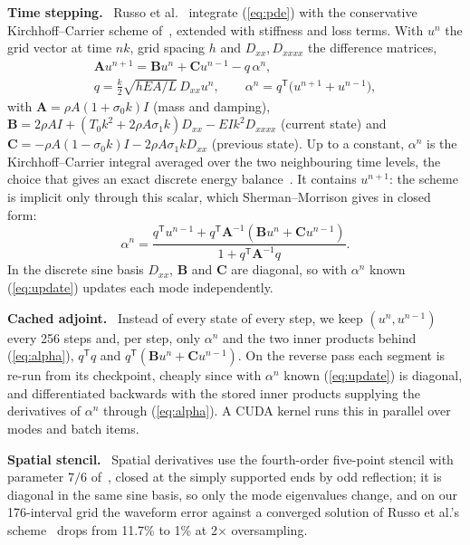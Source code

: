 \documentclass[a4paper]{article}
\newcommand{\head}[1]{\par\vspace{2pt}\noindent\textbf{#1.}\ \ignorespaces}
\begin{document}
\begin{sloppy}
\head{Time stepping}
Russo et al.~\cite{russo2026} integrate (\ref{eq:pde}) with the conservative
Kirchhoff--Carrier scheme of~\cite[Sec.~8.1.2]{bilbao2009}, extended with
stiffness and loss terms. With $u^{n}$ the grid vector at time $nk$, grid
spacing $h$ and $D_{xx},D_{xxxx}$ the difference matrices,
\begin{equation}
\begin{gathered}
\mathbf{A}u^{n+1}=\mathbf{B}u^{n}+\mathbf{C}u^{n-1}-q\,\alpha^n,\\
q=\tfrac{k}{2}\sqrt{hEA/L}\,D_{xx}u^{n},\qquad
\alpha^n=q^{\mathsf T}\big(u^{n+1}+u^{n-1}\big),
\end{gathered}
\label{eq:update}
\end{equation}
with $\mathbf{A}=\rho A(1+\sigma_0k)I$ (mass and damping),
$\mathbf{B}=2\rho AI+(T_0k^2+2\rho A\sigma_1k)D_{xx}-EIk^2D_{xxxx}$ (current
state) and $\mathbf{C}=-\rho A(1-\sigma_0k)I-2\rho A\sigma_1kD_{xx}$ (previous
state). Up to a constant, $\alpha^n$ is the Kirchhoff--Carrier integral
averaged over the two neighbouring time levels, the choice that gives an exact
discrete energy balance~\cite[eq.~8.9]{bilbao2009}. It contains $u^{n+1}$:
the scheme is implicit only through this scalar, which Sherman--Morrison gives
in closed form:
\begin{equation}
\alpha^n=\frac{q^{\mathsf T}u^{n-1}+q^{\mathsf T}\mathbf{A}^{-1}
 (\mathbf{B}u^{n}+\mathbf{C}u^{n-1})}{1+q^{\mathsf T}\mathbf{A}^{-1}q}.
\label{eq:alpha}
\end{equation}
In the discrete sine basis $D_{xx}$, $\mathbf{B}$ and $\mathbf{C}$ are
diagonal, so with $\alpha^n$ known (\ref{eq:update}) updates each mode
independently.

\head{Cached adjoint}
Instead of every state of every step, we keep $(u^{n},u^{n-1})$ every 256 steps
and, per step, only $\alpha^n$ and the two inner products behind
(\ref{eq:alpha}), $q^{\mathsf T}q$ and
$q^{\mathsf T}(\mathbf{B}u^{n}+\mathbf{C}u^{n-1})$. On the reverse pass each
segment is re-run from its checkpoint, cheaply since with $\alpha^n$ known
(\ref{eq:update}) is diagonal, and differentiated backwards with the stored
inner products supplying the derivatives of $\alpha^n$ through
(\ref{eq:alpha}). A CUDA kernel runs this in parallel over modes and batch
items.

\head{Spatial stencil}
Spatial derivatives use the fourth-order five-point stencil with parameter
$7/6$ of~\cite[Sec.~6.3.1]{bilbao2009}, closed at the simply supported ends
by odd reflection; it is diagonal in the same sine basis, so only the mode
eigenvalues change, and on our 176-interval grid the waveform error against
a converged solution of Russo et al.'s scheme~\cite{russo2026} drops from
11.7\% to 1\% at 2$\times$ oversampling.


\end{sloppy}
\end{document}
